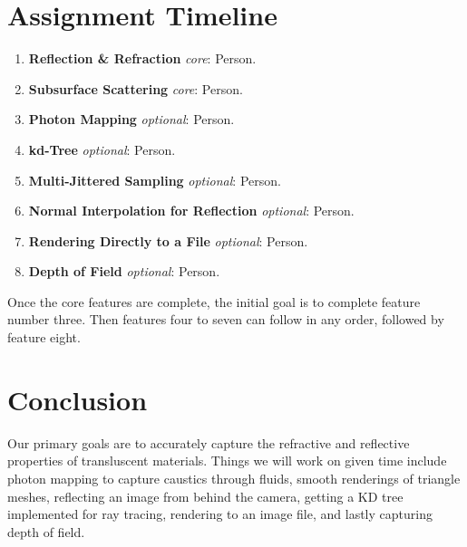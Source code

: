 \documentclass[journal, a4paper]{IEEEtran}
\begin{document}
\section{Assignment Timeline}
    \begin{enumerate}
        \item \textbf{Reflection \& Refraction} \emph{core}: Person.
        \item \textbf{Subsurface Scattering} \emph{core}: Person.
        \item \textbf{Photon Mapping} \emph{optional}: Person.
        \item \textbf{kd-Tree} \emph{optional}: Person.
        \item \textbf{Multi-Jittered Sampling} \emph{optional}: Person.
        \item \textbf{Normal Interpolation for Reflection} \emph{optional}: Person.
        \item \textbf{Rendering Directly to a File} \emph{optional}: Person.
        \item \textbf{Depth of Field} \emph{optional}: Person.
    \end{enumerate}
    Once the core features are complete, the initial goal is to complete feature number three. Then features four to seven can follow in any order, followed by feature eight.

\section{Conclusion}
    Our primary goals are to accurately capture the refractive and reflective properties of transluscent materials. Things we will work on given time include photon mapping to capture caustics through fluids, smooth renderings of triangle meshes, reflecting an image from behind the camera, getting a KD tree implemented for ray tracing, rendering to an image file, and lastly  capturing depth of field.
\end{document}
